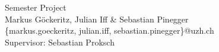 \begin{titlepage}

\maketitle

\iftexshop
\setprotcode\font
{\it \setprotcode \font}
{\bf \setprotcode \font}
{\bf \it \setprotcode \font}
\fi

\noindent Semester Project\\
\noindent Markus G\"ockeritz, Julian Iff \& Sebastian Pinegger\\
\noindent \{markus.goeckeritz, julian.iff, sebastian.pinegger\}@uzh.ch\\
\noindent Supervisor: Sebastian Proksch

\end{titlepage}

